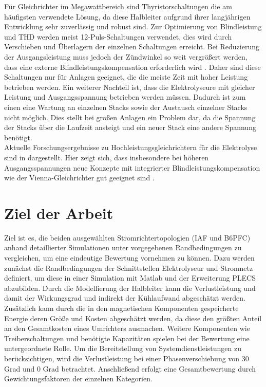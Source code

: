 Für Gleichrichter im Megawattbereich sind Thyristorschaltungen die am häufigsten verwendete Lösung, da diese Halbleiter aufgrund ihrer langjährigen Entwicklung sehr zuverlässig und robust sind. Zur Optimierung von Blindleistung und \gls{THD} werden meist 12-Puls-Schaltungen verwendet, dies wird durch Verschieben und Überlagern der einzelnen Schaltungen erreicht. Bei Reduzierung der Ausgangsleistung muss jedoch der Zündwinkel so weit vergrößert werden, dass eine externe Blindleistungskompensation erforderlich wird \cite{HydrogenElectronicTopologies}. Daher sind diese Schaltungen nur für Anlagen geeignet, die die meiste Zeit mit hoher Leistung betrieben werden. Ein weiterer Nachteil ist, dass die Elektrolyseure mit gleicher Leistung und Ausgangsspannung betrieben werden müssen. Dadurch ist zum einen eine Wartung an einzelnen Stacks sowie der Austausch einzelner Stacks nicht möglich. Dies stellt bei großen Anlagen ein Problem dar, da die Spannung der Stacks über die Laufzeit ansteigt und ein neuer Stack eine andere Spannung benötigt.\\
Aktuelle Forschungsergebnisse zu Hochleistungsgleichrichtern für die Elektrolyse sind in \cite{HydrogenRectifier} dargestellt. Hier zeigt sich, dass insbesondere bei höheren Ausgangsspannungen neue Konzepte mit integrierter Blindleistungskompensation wie der Vienna-Gleichrichter gut geeignet sind \cite{HydrogenRectifier}.
\pagebreak
\section{Ziel der Arbeit}
Ziel ist es, die beiden ausgewählten Stromrichtertopologien (\gls{IAF} und \gls{B6PFC}) anhand detaillierter Simulationen unter vorgegebenen Randbedingungen zu vergleichen, um eine eindeutige Bewertung vornehmen zu können. Dazu werden zunächst die Randbedingungen der Schnittstellen Elektrolyseur und Stromnetz definiert, um diese in einer Simulation mit Matlab und der Erweiterung PLECS abzubilden. Durch die Modellierung der Halbleiter kann die Verlustleistung und damit der Wirkungsgrad und indirekt der Kühlaufwand abgeschätzt werden. Zusätzlich kann durch die in den magnetischen Komponenten gespeicherte Energie deren Größe und Kosten abgeschätzt werden, da diese den größten Anteil an den Gesamtkosten eines Umrichters ausmachen. Weitere Komponenten wie Treiberschaltungen und benötigte Kapazitäten spielen bei der Bewertung eine untergeordnete Rolle. Um die Bereitstellung von Systemdienstleistungen zu berücksichtigen, wird die Verlustleistung bei einer Phasenverschiebung von 30 Grad und 0 Grad betrachtet. Anschließend erfolgt eine Gesamtbewertung durch Gewichtungsfaktoren der einzelnen Kategorien.